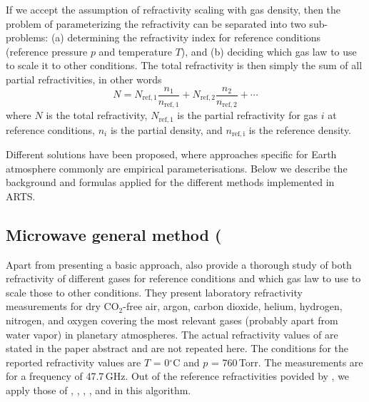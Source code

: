 If we accept the assumption of refractivity scaling with gas
density, then the problem of parameterizing the refractivity can
be separated into two sub-problems: (a) determining the refractivity
index for reference conditions (reference pressure $p$ and temperature
$T$), and (b) deciding which gas law to use to scale it to other
conditions. The total refractivity is then simply the sum of all
partial refractivities, in other words
\begin{equation}
  \label{eq:N_density}
  N = N_{\mathrm{ref},1} \frac{n_1}{n_\mathrm{ref,1}} + 
      N_{\mathrm{ref},2} \frac{n_2}{n_\mathrm{ref,2}} + \cdots
\end{equation}
where $N$ is the total refractivity, $N_{\mathrm{ref},1}$ is the
partial refractivity for gas $i$ at reference conditions, $n_i$ is
the partial density, and $n_\mathrm{ref,i}$ is the reference density.

Different solutions have been proposed, where approaches specific for Earth
atmosphere commonly are empirical parameterisations.
Below we describe the background and formulas applied for the different methods
implemented in ARTS.

\subsection{Microwave general method (}
 \label{sec:rindex:mwgeneral}

Apart from presenting a basic approach, \citet{newell65:_absolute_jap} also
provide a thorough study of both refractivity of different gases for reference
conditions and which gas law to use to scale those to other
conditions. They present laboratory
refractivity measurements for dry CO$_2$-free air, argon,
carbon dioxide, helium, hydrogen, nitrogen, and oxygen covering the
most relevant gases (probably apart from water vapor) in planetary atmospheres.
The actual refractivity values of \citet{newell65:_absolute_jap}
are stated in the paper abstract and are not repeated here. The
conditions for the reported refractivity values are $T$ =
0$^\circ$C and $p$ = 760\,Torr. The measurements are for a frequency
of 47.7\,GHz.
Out of the reference refractivities povided by \citet{newell65:_absolute_jap},
we apply those of , , , , and 
in this algorithm.

